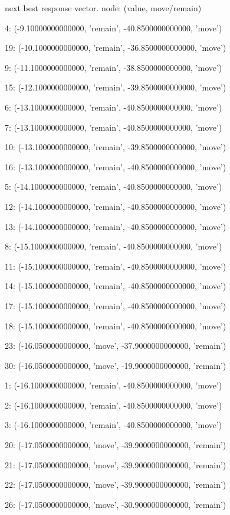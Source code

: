  next best response vector.  node: (value, move/remain)


4: (-9.10000000000000, 'remain', -40.8500000000000, 'move')


19: (-10.1000000000000, 'remain', -36.8500000000000, 'move')


9: (-11.1000000000000, 'remain', -38.8500000000000, 'move')


15: (-12.1000000000000, 'remain', -39.8500000000000, 'move')


6: (-13.1000000000000, 'remain', -40.8500000000000, 'move')


7: (-13.1000000000000, 'remain', -40.8500000000000, 'move')


10: (-13.1000000000000, 'remain', -39.8500000000000, 'move')


16: (-13.1000000000000, 'remain', -40.8500000000000, 'move')


5: (-14.1000000000000, 'remain', -40.8500000000000, 'move')


12: (-14.1000000000000, 'remain', -40.8500000000000, 'move')


13: (-14.1000000000000, 'remain', -40.8500000000000, 'move')


8: (-15.1000000000000, 'remain', -40.8500000000000, 'move')


11: (-15.1000000000000, 'remain', -40.8500000000000, 'move')


14: (-15.1000000000000, 'remain', -40.8500000000000, 'move')


17: (-15.1000000000000, 'remain', -40.8500000000000, 'move')


18: (-15.1000000000000, 'remain', -40.8500000000000, 'move')


23: (-16.0500000000000, 'move', -37.9000000000000, 'remain')


30: (-16.0500000000000, 'move', -19.9000000000000, 'remain')


1: (-16.1000000000000, 'remain', -40.8500000000000, 'move')


2: (-16.1000000000000, 'remain', -40.8500000000000, 'move')


3: (-16.1000000000000, 'remain', -40.8500000000000, 'move')


20: (-17.0500000000000, 'move', -39.9000000000000, 'remain')


21: (-17.0500000000000, 'move', -39.9000000000000, 'remain')


22: (-17.0500000000000, 'move', -39.9000000000000, 'remain')


26: (-17.0500000000000, 'move', -30.9000000000000, 'remain')


